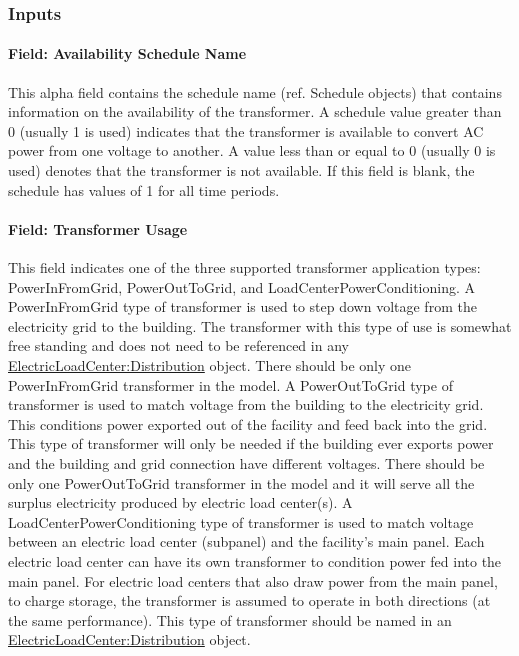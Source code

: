 \subsubsection{Inputs}\label{inputs-014}

\paragraph{Field: Availability Schedule Name}\label{field-availability-schedule-name-005}

This alpha field contains the schedule name (ref. Schedule objects) that contains information on the availability of the transformer. A schedule value greater than 0 (usually 1 is used) indicates that the transformer is available to convert AC power from one voltage to another. A value less than or equal to 0 (usually 0 is used) denotes that the transformer is not available. If this field is blank, the schedule has values of 1 for all time periods.

\paragraph{Field: Transformer Usage}\label{field-transformer-usage}

This field indicates one of the three supported transformer application types: PowerInFromGrid, PowerOutToGrid, and LoadCenterPowerConditioning. A PowerInFromGrid type of transformer is used to step down voltage from the electricity grid to the building. The transformer with this type of use is somewhat free standing and does not need to be referenced in any \hyperref[electricloadcenterdistribution]{ElectricLoadCenter:Distribution} object. There should be only one PowerInFromGrid transformer in the model. A PowerOutToGrid type of transformer is used to match voltage from the building to the electricity grid. This conditions power exported out of the facility and feed back into the grid. This type of transformer will only be needed if the building ever exports power and the building and grid connection have different voltages. There should be only one PowerOutToGrid transformer in the model and it will serve all the surplus electricity produced by electric load center(s). A LoadCenterPowerConditioning type of transformer is used to match voltage between an electric load center (subpanel) and the facility's main panel. Each electric load center can have its own transformer to condition power fed into the main panel. For electric load centers that also draw power from the main panel, to charge storage, the transformer is assumed to operate in both directions (at the same performance). This type of transformer should be named in an \hyperref[electricloadcenterdistribution]{ElectricLoadCenter:Distribution} object.

